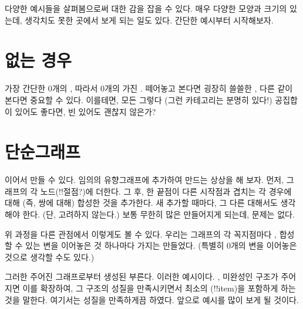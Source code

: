 
\lettrine[lhang=0.17]{다}{양한 예시들을} 살펴봄으로써  대한 감을 잡을 수 있다.
매우 다양한 모양과 크기의 \trCategory\가 있는데, 생각치도 못한 곳에서 \trCategory\를 보게 되는 일도 있다.
간단한 예시부터 시작해보자.

\section{\trObject\가 없는 경우}

가장 간단한 \trCategory\은 0개의 \trObject, 따라서 0개의 \trMorphism\을 가진 \trCategory{}. 
떼어놓고 본다면 굉장히 쓸쓸한 , 다른 \trCategory\와 같이 본다면 중요할 수 있다.
이를테면, 모든   그렇다 (그런 카테고리는 분명히 있다!)
공집합이 있어도 좋다면, 빈 \trCategory\가 있어도 괜찮지 않은가?

\section{단순그래프}

\trObject\를 \trArrow\로 이어서 \trCategory\를 만들 수 있다.
임의의 유향그래프에 \trArrow\를 추가하여 \trCategory\를 만드는 상상을 해 보자.
먼저, 그래프의 각 노드(!!절점?)에 \trIdentity  \trArrow\를 더한다. 
그 후, 한  끝점이 다른  시작점과 겹치는 각 경우에 대해
(즉, \trComposition{} 쌍에 대해)  합성한 것을 추가한다.
새 \trArrow\를 추가할 때마다, 그 \trArrow\와 다른   대해서도 생각해야 한다.
(단, \trIdentity  \trArrow\는 고려하지 않는다.)
보통 무한히 많은 \trArrow\가 만들어지게 되는데, 문제는 없다.

위 과정을 다른 관점에서 이렇게도 볼 수 있다. 우리는 그래프의 각 꼭지점마다 \trObject\를, 
합성할 수 있는 변을 이어놓은 것 하나마다 \trMorphism\를 가지는 \trCategory\를 만들었다.
(\trIdentityMorphism\은 특별히 0개의 변을 이어놓은 것으로 생각할 수도 있다.)

그러한 \trCategory\는 주어진 그래프로부터 생성된 \trFreeCategory{} 부른다.
이러한 \trCategory\는  예시이다. , 
미완성인 구조가 주어지면 이를 확장하여, 그 구조의 성질을 만족시키면서 최소의 (!!item)을 포함하게 하는 것을 말한다. %
여기서는  성질을 만족하게끔 하였다. 
앞으로  예시를 많이 보게 될 것이다.

\section{\trOrder}

